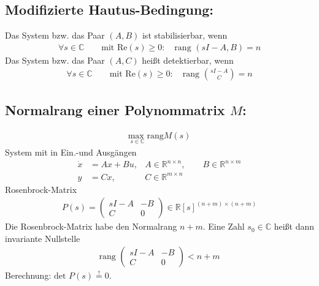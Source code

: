 \documentclass[ngerman]{tudscrreprt}
\begin{document}
\subsection*{Modifizierte Hautus-Bedingung:}
Das System bzw. das Paar $(A,B)$ ist stabilisierbar, wenn \begin{align*}
\forall s\in \mathbb{C} \qquad \text{mit  Re}(s)\ge 0: \quad \text{rang }(sI - A, B) = n
\end{align*}
Das System bzw. das Paar $(A,C)$ heißt detektierbar, wenn \begin{align*}
\forall s\in \mathbb{C} \qquad \text{mit  Re}(s)\ge 0: \quad \text{rang }\binom{sI-A}{C} = n
\end{align*}
\subsection*{Normalrang einer Polynommatrix $M$:}
\begin{align*}
\underset{s\in \mathbb{C}}{\text{max }} \text{rang} M(s)
\end{align*}
System mit in Ein.-und Ausgängen \begin{align*}
\dot x &= Ax + Bu, &A\in \mathbb{R}^{n\times n}, \qquad B\in \mathbb{R}^{n\times m}\\ 
y &= Cx, &C\in \mathbb{R}^{m\times n}
\end{align*}
Rosenbrock-Matrix
\begin{align*}
P(s) = \begin{pmatrix}
sI-A & -B\\ C & 0 \end{pmatrix} \in \mathbb{R}[s]^{(n+m)\times(n+m)} 
\end{align*}
Die Rosenbrock-Matrix habe den Normalrang $n+m$. Eine Zahl $s_0 \in \mathbb{C}$ heißt dann invariante Nullstelle 
\begin{align*}
\text{rang }\begin{pmatrix}
sI-A & -B\\ C & 0 \end{pmatrix} < n+m
\end{align*}
Berechnung: $\text{det }P(s) \overset{!}{=} 0.$
\end{document}

